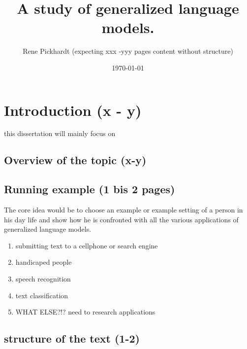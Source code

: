 \documentclass[•]{book}
\title{A study of generalized language models.}
\author{Rene Pickhardt (expecting xxx -yyy pages content without structure)}
\date{\today}
\begin{document}
\maketitle
\tableofcontents


\chapter{Introduction (x - y)}
this dissertation will mainly focus on \cite{own:typology:2013}
\section{Overview of the topic (x-y)}

\section{Running example (1 bis 2 pages)}
The core idea would be to choose an example or example setting of a person in his day life and show how he is confronted with all the various applications of generalized language models.
\begin{enumerate}
\item submitting text to a cellphone or search engine
\item handicaped people
\item speech recognition
\item text classification
\item WHAT ELSE?!? need to research applications
\end{enumerate}

\section{structure of the text (1-2)}
\end{document}
